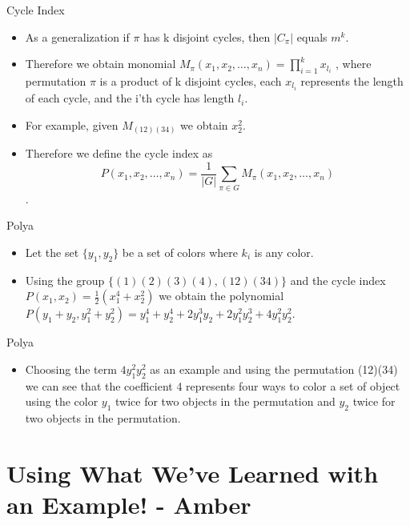 \documentclass{beamer}
\begin{document}
%
%
\begin{frame}{Cycle Index}
\begin{itemize}
\item As a generalization if $\pi$ has k disjoint cycles, then $\vert C_{\pi}\vert$ equals $m^k$.
\item Therefore we obtain monomial $M_{\pi}(x_{1}, x_{2}, \ldots,x_{n}) = \displaystyle \prod_{i=1}^{k}x_{l_{i}}$ , where permutation $\pi$ is a product of k disjoint cycles, each $x_{l_{i}}$ represents the length of each cycle, and the i'th cycle has length $l_{i}$.
\item For example, given $M_{(12)(34)}$ we obtain $x_{2}^{2}$.
\item Therefore we define the cycle index as $$P(x_{1}, x_{2}, \ldots,x_{n})=\frac{1}{|G|}\sum_{\pi\in G}M_{\pi}(x_{1}, x_{2}, \ldots,x_{n})$$.
\end{itemize}
\end{frame}

%
%
\begin{frame}{Polya}
\begin{itemize}
\item Let the set $\{y_{1}, y_{2}\}$ be a set of colors where $k_{i}$ is any color.
\item Using the group $\{(1)(2)(3)(4), (12)(34)\}$ and the cycle index $P(x_{1},x_{2}) = \frac{1}{2}(x_{1}^{4} + x_{2}^{2})$ we obtain the polynomial $P(y_{1}+y_{2} , y_{1}^{2}+y_{2}^{2}) = y_{1}^{4} + y_{2}^{4} + 2y_{1}^{3}y_{2} + 2y_{1}^{2}y_{2}^{3} + 4y_{1}^{2}y_{2}^{2}$.
\end{itemize}
\end{frame}

%
%
\begin{frame}{Polya}
\begin{itemize}
\item Choosing the term $4y_{1}^{2}y_{2}^{2}$ as an example and using the permutation (12)(34) we can see that the coefficient 4 represents four ways to color a set of object using the color $y_{1}$ twice for two objects in the permutation and $y_{2}$ twice for two objects in the permutation.
\end{itemize}
\end{frame}
\section{Using What We've Learned with an Example! - Amber}
\end{document}

